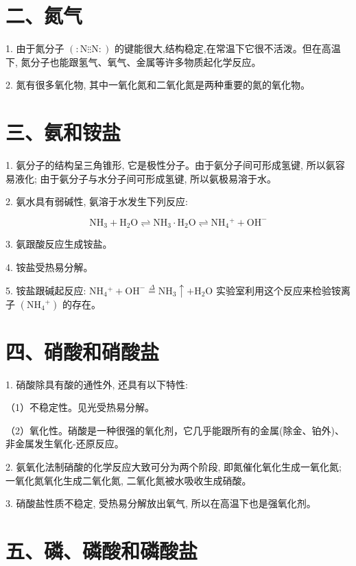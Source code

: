 \documentclass[10pt]{article}
\begin{document}
\section*{二、氮气}

1. 由于氮分子 \(\left( { : \mathrm{N}\vdots \vdots \mathrm{N} : }\right)\) 的键能很大,结构稳定,在常温下它很不活泼。但在高温下, 氮分子也能跟氢气、氧气、金属等许多物质起化学反应。

2. 氮有很多氧化物, 其中一氧化氮和二氧化氮是两种重要的氮的氧化物。

\section*{三、氨和铵盐}

1. 氨分子的结构呈三角锥形, 它是极性分子。由于氨分子间可形成氢键, 所以氨容易液化; 由于氨分子与水分子间可形成氢键, 所以氨极易溶于水。

2. 氨水具有弱碱性, 氨溶于水发生下列反应:

\[
{\mathrm{{NH}}}_{3} + {\mathrm{H}}_{2}\mathrm{O} \rightleftharpoons {\mathrm{{NH}}}_{3} \cdot {\mathrm{H}}_{2}\mathrm{O} \rightleftharpoons {\mathrm{{NH}}}_{4}{}^{ + } + {\mathrm{{OH}}}^{ - }
\]

3. 氨跟酸反应生成铵盐。

4. 铵盐受热易分解。

5. 铵盐跟碱起反应: \({\mathrm{{NH}}}_{4}{}^{ + } + {\mathrm{{OH}}}^{ - }\overset{\Delta }{ = }{\mathrm{{NH}}}_{3} \uparrow + {\mathrm{H}}_{2}\mathrm{O}\) 实验室利用这个反应来检验铵离子 \(\left( {{\mathrm{{NH}}}_{4}{}^{ + }}\right)\) 的存在。

\section*{四、硝酸和硝酸盐}

1. 硝酸除具有酸的通性外, 还具有以下特性:

（1）不稳定性。见光受热易分解。

（2）氧化性。硝酸是一种很强的氧化剂，它几乎能跟所有的金属(除金、铂外)、非金属发生氧化-还原反应。

2. 氨氧化法制硝酸的化学反应大致可分为两个阶段, 即氮催化氧化生成一氧化氮; 一氧化氮氧化生成二氧化氮, 二氧化氮被水吸收生成硝酸。

3. 硝酸盐性质不稳定, 受热易分解放出氧气, 所以在高温下也是强氧化剂。

\section*{五、磷、磷酸和磷酸盐}
\end{document}
